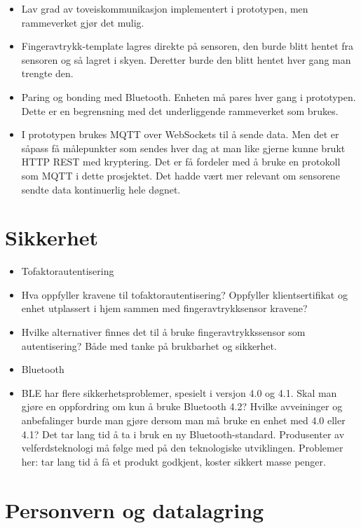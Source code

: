 \begin{itemize}
\tightlist
\item
  Lav grad av toveiskommunikasjon implementert i prototypen, men rammeverket gjør det mulig.
\item
  Fingeravtrykk-template lagres direkte på sensoren, den burde blitt
  hentet fra sensoren og så lagret i skyen. Deretter burde den blitt
  hentet hver gang man trengte den.
\item
  Paring og bonding med Bluetooth. Enheten må pares hver gang i
  prototypen. Dette er en begrensning med det underliggende rammeverket
  som brukes.
\item
  I prototypen brukes MQTT over WebSockets til å sende data. Men det er
  såpass få målepunkter som sendes hver dag at man like gjerne kunne
  brukt HTTP REST med kryptering. Det er få fordeler med å bruke en
  protokoll som MQTT i dette prosjektet. Det hadde vært mer relevant om
  sensorene sendte data kontinuerlig hele døgnet.
\end{itemize}

\section{Sikkerhet}\label{sikkerhet}

\begin{itemize}
\tightlist
\item
  Tofaktorautentisering
\item
  Hva oppfyller kravene til tofaktorautentisering? Oppfyller
  klientsertifikat og enhet utplassert i hjem sammen med
  fingeravtrykksensor kravene?
\item
  Hvilke alternativer finnes det til å bruke fingeravtrykkssensor som
  autentisering? Både med tanke på brukbarhet og sikkerhet.
\item
  Bluetooth
\item
  BLE har flere sikkerhetsproblemer, spesielt i versjon 4.0 og 4.1. Skal
  man gjøre en oppfordring om kun å bruke Bluetooth 4.2? Hvilke
  avveininger og anbefalinger burde man gjøre dersom man må bruke en
  enhet med 4.0 eller 4.1? Det tar lang tid å ta i bruk en ny
  Bluetooth-standard. Produsenter av velferdsteknologi må følge med på
  den teknologiske utviklingen. Problemer her: tar lang tid å få et
  produkt godkjent, koster sikkert masse penger.
\end{itemize}

\section{Personvern og datalagring}\label{personvern-og-datalagring}

